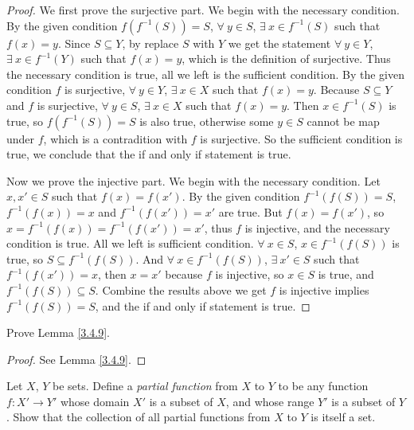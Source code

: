 \begin{proof}
We first prove the surjective part.
We begin with the necessary condition.
By the given condition \(f(f^{-1}(S)) = S\), \(\forall\ y \in S\), \(\exists\ x \in f^{-1}(S)\) such that \(f(x) = y\).
Since \(S \subseteq Y\), by replace \(S\) with \(Y\) we get the statement \(\forall\ y \in Y\), \(\exists\ x \in f^{-1}(Y)\) such that \(f(x) = y\), which is the definition of surjective.
Thus the necessary condition is true, all we left is the sufficient condition.
By the given condition \(f\) is surjective, \(\forall\ y \in Y\), \(\exists\ x \in X\) such that \(f(x) = y\).
Because \(S \subseteq Y\) and \(f\) is surjective, \(\forall\ y \in S\), \(\exists\ x \in X\) such that \(f(x) = y\).
Then \(x \in f^{-1}(S)\) is true, so \(f(f^{-1}(S)) = S\) is also true, otherwise some \(y \in S\) cannot be map under \(f\), which is a contradition with \(f\) is surjective.
So the sufficient condition is true, we conclude that the if and only if statement is true.

Now we prove the injective part.
We begin with the necessary condition.
Let \(x, x' \in S\) such that \(f(x) = f(x')\).
By the given condition \(f^{-1}(f(S)) = S\), \(f^{-1}(f(x)) = x\) and \(f^{-1}(f(x')) = x'\) are true.
But \(f(x) = f(x')\), so \(x = f^{-1}(f(x)) = f^{-1}(f(x')) = x'\), thus \(f\) is injective, and the necessary condition is true.
All we left is sufficient condition.
\(\forall\ x \in S\), \(x \in f^{-1}(f(S))\) is true, so \(S \subseteq f^{-1}(f(S))\).
And \(\forall\ x \in f^{-1}(f(S))\), \(\exists\ x' \in S\) such that \(f^{-1}(f(x')) = x\), then \(x = x'\) because \(f\) is injective, so \(x \in S\) is true, and \(f^{-1}(f(S)) \subseteq S\).
Combine the results above we get \(f\) is injective implies \(f^{-1}(f(S)) = S\), and the if and only if statement is true.
\end{proof}

\begin{exercise}\label{3.4.6}
Prove Lemma \ref{3.4.9}.
\end{exercise}

\begin{proof}
See Lemma \ref{3.4.9}.
\end{proof}

\begin{exercise}\label{ex 3.4.7}
Let \(X\), \(Y\) be sets.
Define a \emph{partial function} from \(X\) to \(Y\) to be any function \(f : X' \to Y'\) whose domain \(X'\) is a subset of \(X\), and whose range \(Y'\) is a subset of \(Y\).
Show that the collection of all partial functions from \(X\) to \(Y\) is itself a set.
\end{exercise}

